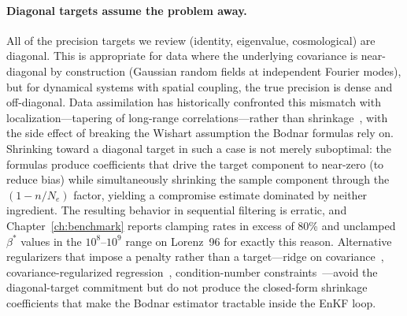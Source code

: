 \paragraph{Diagonal targets assume the problem away.}
All of the precision targets we review (identity, eigenvalue, cosmological) are diagonal. This is appropriate for data where the underlying covariance is near-diagonal by construction (Gaussian random fields at independent Fourier modes), but for dynamical systems with spatial coupling, the true precision is dense and off-diagonal. Data assimilation has historically confronted this mismatch with localization---tapering of long-range correlations---rather than shrinkage~\citep{gaspari1999construction,hamill2001distance,furrer2006covariance,menetrier2015linear}, with the side effect of breaking the Wishart assumption the Bodnar formulas rely on. Shrinking toward a diagonal target in such a case is not merely suboptimal: the~\citet{bodnar2016direct} formulas produce coefficients that drive the target component to near-zero (to reduce bias) while simultaneously shrinking the sample component through the $(1 - n/N_e)$ factor, yielding a compromise estimate dominated by neither ingredient. The resulting behavior in sequential filtering is erratic, and Chapter~\ref{ch:benchmark} reports clamping rates in excess of 80\% and unclamped $\beta^*$ values in the $10^8$--$10^9$ range on Lorenz~96 for exactly this reason. Alternative regularizers that impose a penalty rather than a target---ridge on covariance~\citep{warton2008penalized}, covariance-regularized regression~\citep{witten2009covariance}, condition-number constraints~\citep{won2013condition}---avoid the diagonal-target commitment but do not produce the closed-form shrinkage coefficients that make the Bodnar estimator tractable inside the EnKF loop.

